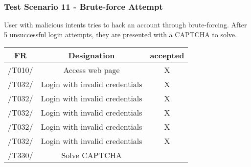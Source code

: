\subsubsection{Test Scenario 11 -  Brute-force Attempt}
User with malicious intents tries to hack an account through brute-forcing. After 5
unsuccessful login attempts, they are presented with a CAPTCHA to solve.
\begin{table}[h]
\begin{tabular}{!{\VRule}c!{\VRule}c!{\VRule}c!{\VRule}}
\hline
FR     & Designation                                                                    &accepted                \\
\hline
  /T010/ &  Access web page &   X  \\
 \hline
 /T032/  &  Login with invalid credentials &   X  \\
 \hline
 /T032/  &  Login with invalid credentials &   X  \\
 \hline
 /T032/  &  Login with invalid credentials &   X \\
 \hline
 /T032/  &  Login with invalid credentials &   X \\
 \hline
 /T032/  &  Login with invalid credentials &   X \\
 \hline
 /T330/  &  Solve CAPTCHA &     \\
 \hline
  
\end{tabular}
\end{table}

